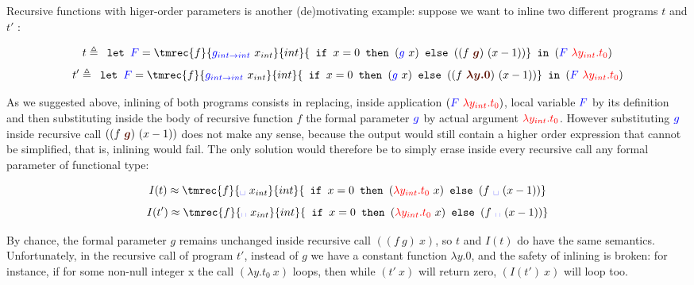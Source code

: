 \documentclass[a4paper,11pt,oneside]{article}
\theoremstyle{plain}
\begin{document}
Recursive functions with  higer-order parameters is another (de)motivating
example: suppose we want to inline two different programs $t$ and $t'$ :
	\begin{footnotesize}
	$$ t \triangleq 
		\texttt{ let } \textcolor{blue}{F} =
  		\tmrec{f}{\textcolor{blue}{g_{int \rightarrow int}}~x_{int}}{int} 
  		{\texttt{ if } x = 0 
  		\texttt{ then } (\textcolor{blue}{g}~x) 
  		\texttt{ else }((f~\textcolor{Sepia}{\boldsymbol{g}})~(x - 1))} 
  		\texttt{ in }
  		(\textcolor{blue}{F}~\textcolor{red}{\lambda y_{int}. t_0})$$ 
  $$ t' \triangleq 
  \texttt{ let } \textcolor{blue}{F} =
  \tmrec{f}{\textcolor{blue}{g_{int \rightarrow int}}~x_{int}}{int} 
  {\texttt{ if } x = 0 
  \texttt{ then } (\textcolor{blue}{g}~x) 
  \texttt{ else } ((f~\textcolor{Sepia}{\boldsymbol{\lambda y. 0}})~(x-1))} 
  \texttt{ in }(\textcolor{blue}{F}~\textcolor{red}{\lambda y_{int}.t_0})$$
\end{footnotesize}
As we suggested above, inlining of both programs consists in replacing,
inside application $(\textcolor{blue}{F}~\textcolor{red}{\lambda y_{int}. t_0})$, 
local variable $\textcolor{blue}{F}$ by its definition and
then substituting inside the body of recursive function $f$ the formal parameter
$\textcolor{blue}{g}$ by actual argument 
$\textcolor{red}{\lambda y_{int}. t_0}$. 
However substituting $\textcolor{blue}{g}$ inside recursive call 
$((f~\textcolor{Sepia}{\boldsymbol{g}})~(x - 1))$ does not make any sense,
because the output would still contain a higher order expression that cannot be
simplified, that is, inlining would fail. The only solution would therefore be to
simply erase inside every recursive call any formal parameter of functional
type:
	\begin{footnotesize}
	$$ I(t) \approx
  \tmrec{f}{\textcolor{blue}{\text{\textvisiblespace}}~x_{int}}{int}
  	{\texttt{ if } x = 0\texttt{ then }(\textcolor{red}{\lambda y_{int}.t_0}~x)
    \texttt{ else } (f~\textcolor{blue}{\text{\textvisiblespace}}~(x-1))} $$
	$$ I(t') \approx
  \tmrec{f}{\textcolor{blue}{\text{\textvisiblespace}}~x_{int}}{int} 
  	{\texttt{ if }x = 0\texttt{ then }(\textcolor{red}{\lambda y_{int}.t_0}~x)
    \texttt{ else }(f~\textcolor{blue}{\text{\textvisiblespace}}~(x-1))} $$
	\end{footnotesize}
By chance, the formal parameter $g$ remains unchanged inside recursive call
$((f~g)~x)$, so $t$ and $I(t)$ do have the same semantics. Unfortunately, in the
recursive call of program $t'$, instead of $g$ we have a constant function
$\lambda y. 0$, and the safety of inlining is broken: for instance, if for some
non-null integer x the call $(\lambda y. t_0~x)$ loops, then while $(t'~x)$ will
return zero, $(I(t')~x)$ will loop too.
\end{document}

